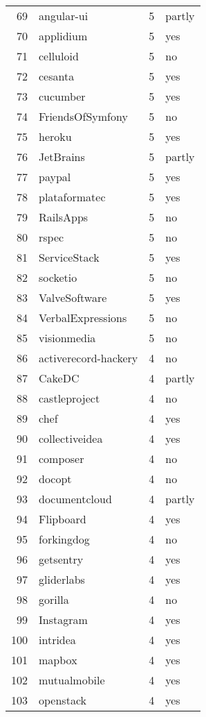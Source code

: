 {\begin{longtable}{rlrl}
    69 & angular-ui &   5 & partly \\
    70 & applidium &   5 & yes \\
    71 & celluloid &   5 & no \\
    72 & cesanta &   5 & yes \\
    73 & cucumber &   5 & yes \\
    74 & FriendsOfSymfony &   5 & no \\
    75 & heroku &   5 & yes \\
    76 & JetBrains &   5 & partly \\
    77 & paypal &   5 & yes \\
    78 & plataformatec &   5 & yes \\
    79 & RailsApps &   5 & no \\
    80 & rspec &   5 & no \\
    81 & ServiceStack &   5 & yes \\
    82 & socketio &   5 & no \\
    83 & ValveSoftware &   5 & yes \\
    84 & VerbalExpressions &   5 & no \\
    85 & visionmedia &   5 & no \\
    86 & activerecord-hackery &   4 & no \\
    87 & CakeDC &   4 & partly \\
    88 & castleproject &   4 & no \\
    89 & chef &   4 & yes \\
    90 & collectiveidea &   4 & yes \\
    91 & composer &   4 & no \\
    92 & docopt &   4 & no \\
    93 & documentcloud &   4 & partly \\
    94 & Flipboard &   4 & yes \\
    95 & forkingdog &   4 & no \\
    96 & getsentry &   4 & yes \\
    97 & gliderlabs &   4 & yes \\
    98 & gorilla &   4 & no \\
    99 & Instagram &   4 & yes \\
    100 & intridea &   4 & yes \\
    101 & mapbox &   4 & yes \\
    102 & mutualmobile &   4 & yes \\
    103 & openstack &   4 & yes \\

\end{longtable}}
